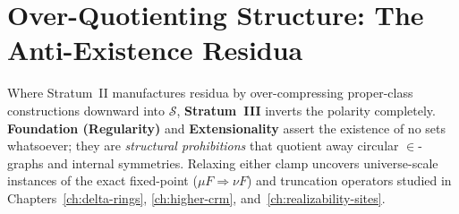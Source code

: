 \section{\texorpdfstring{Over-Quotienting Structure: The Anti-Existence Residua}{Over-Quotienting Structure: The Anti-Existence Residua}}\label{sec:anti-existence-residua}

Where Stratum~II manufactures residua by over-compressing proper-class constructions downward into $\mathcal{S}$, \textbf{Stratum~III} inverts the polarity completely. \textbf{Foundation (Regularity)} and \textbf{Extensionality} assert the existence of no sets whatsoever; they are \emph{structural prohibitions} that quotient away circular $\in$-graphs and internal symmetries. Relaxing either clamp uncovers universe-scale instances of the exact fixed-point ($\mu F \Rightarrow \nu F$) and truncation operators studied in Chapters~\ref{ch:delta-rings}, \ref{ch:higher-crm}, and~\ref{ch:realizability-sites}.

